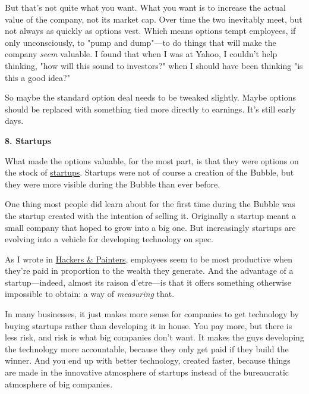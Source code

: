But that's not quite what you want. What you
                  want is to increase the actual value of the company, not its
                  market cap. Over time the two inevitably meet, but not always
                  as quickly as options vest. Which means options tempt
                  employees, if only unconsciously, to "pump and dump"---to
                  do things that will make the company \emph{seem} valuable. I
                  found that when I was at Yahoo, I couldn't help thinking, "how
                  will this sound to investors?" when I should have been
                  thinking "is this a good idea?"

So maybe the
                  standard option deal needs to be tweaked slightly. Maybe
                  options should be replaced with something tied more directly
                  to earnings. It's still early days.

\textbf{8. Startups}

What made the options valuable, for the most
                  part, is that they were options on the stock of
                  \href{http://www.paulgraham.com/start.html}{startups}. Startups were not of course
                  a creation of the Bubble, but they were more visible during
                  the Bubble than ever before.

One thing most people
                  did learn about for the first time during the Bubble was the
                  startup created with the intention of selling it. Originally a
                  startup meant a small company that hoped to grow into a big
                  one. But increasingly startups are evolving into a vehicle for
                  developing technology on spec.

As I wrote in
                  \href{http://www.paulgraham.com/hackpaint.html}{Hackers \& Painters}, employees
                  seem to be most productive when they're paid in proportion to
                  the wealth they generate. And the advantage of a
                  startup---indeed, almost its raison d'etre---is that
                  it offers something otherwise impossible to obtain: a way of
                  \emph{measuring} that.

In many businesses, it just
                  makes more sense for companies to get technology by buying
                  startups rather than developing it in house. You pay more, but
                  there is less risk, and risk is what big companies don't want.
                  It makes the guys developing the technology more accountable,
                  because they only get paid if they build the winner. And you
                  end up with better technology, created faster, because things
                  are made in the innovative atmosphere of startups instead of
                  the bureaucratic atmosphere of big companies.

